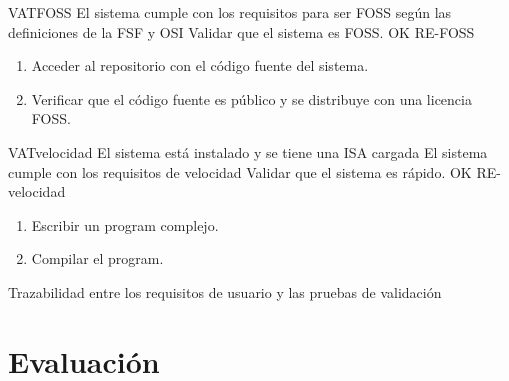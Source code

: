 \begin{testCase}{VAT}{FOSS}
    {\NA} %
    {El sistema cumple con los requisitos para ser \gls{FOSS} según las
    definiciones de la \gls{FSF} \parencite{FreeSoftware} y \gls{OSI}
    \parencite{OpenSource}} %
    {Validar que el sistema es \gls{FOSS}.} %
    {OK} %
    {RE-FOSS} %
    \begin{enumerate}[leftmargin=*, topsep=0pt, noitemsep] %
        \item Acceder al repositorio con el código fuente del sistema.
        \item Verificar que el código fuente es público y se distribuye con una licencia \gls{FOSS}.
    \end{enumerate}
\end{testCase}

\begin{testCase}{VAT}{velocidad}
    {El sistema está instalado y se tiene una \gls{ISA} cargada} %
    {El sistema cumple con los requisitos de velocidad} %
    {Validar que el sistema es rápido.} %
    {OK} %
    {RE-velocidad} %
    \begin{enumerate}[leftmargin=*, topsep=0pt, noitemsep] %
        \item Escribir un \gls{program} complejo.
        \item Compilar el \gls{program}.
    \end{enumerate}
\end{testCase}

    {Trazabilidad entre los requisitos de usuario y las pruebas de validación}

\FloatBarrier

\section{Evaluación}\label{sec:evaluation}

\setcounter{eval}{1}

